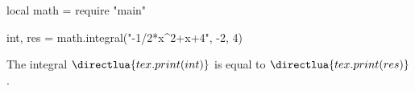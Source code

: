\documentclass{article}
\begin{document}
\begin{luacode}    
    local math = require "main"

    int, res = math.integral("-1/2*x^2+x+4", -2, 4)
\end{luacode}

The integral $\directlua{tex.print(int)}$ is equal to $\directlua{tex.print(res)}$.
\end{document}

